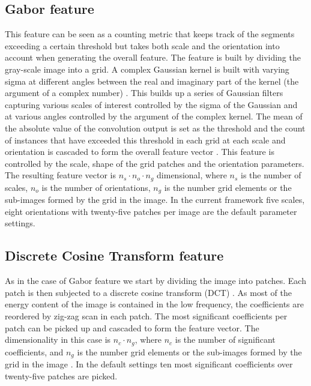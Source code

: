 \documentclass[runningheads]{llncs}
\begin{document}
\subsection{Gabor feature}
\label{ssec:gbf}
This feature can be seen as a counting metric that keeps track of the segments exceeding a certain threshold but takes both scale and the orientation into account when generating the overall feature. The feature is built by dividing the gray-scale image into a grid. A complex Gaussian kernel is built with varying sigma at different angles between the real and imaginary part of the kernel (the argument of a complex number) \cite{CCPBN10}. This builds up a series of Gaussian filters capturing various scales of interest controlled by the sigma of the Gaussian and at various angles controlled by the argument of the complex kernel. The mean of the absolute value of the convolution output is set as the threshold and the count of instances that have exceeded this threshold in each grid at each scale and orientation is cascaded to form the overall feature vector \cite{LKF05}. This feature is controlled by the scale, shape of the grid patches and the orientation parameters. The resulting feature vector is $n_s \cdot n_o \cdot n_g$ dimensional, where $n_s$ is the number of scales, $n_o$ is the number of orientations, $n_g$ is the number grid elements or the sub-images formed by the grid in the image. In the current framework five scales, eight orientations with twenty-five patches per image are the default parameter settings.

\subsection{Discrete Cosine Transform feature}
\label{ssec:dctf}
As in the case of Gabor feature we start by dividing the image into patches. Each patch is then subjected to a discrete cosine transform (DCT)  \cite{ANR74}. As most of the energy content of the image is contained in the low frequency, the coefficients are reordered by zig-zag scan in each patch. The most significant coefficients per patch can be picked up and cascaded to form the feature vector. The dimensionality in this case is $n_c \cdot n_g$, where $n_c$ is the number of significant coefficients, and $n_g$ is the number grid elements or the sub-images formed by the grid in the image \cite{ARJIA08}. In the default settings ten most significant coefficients over twenty-five patches are picked.
\end{document}
